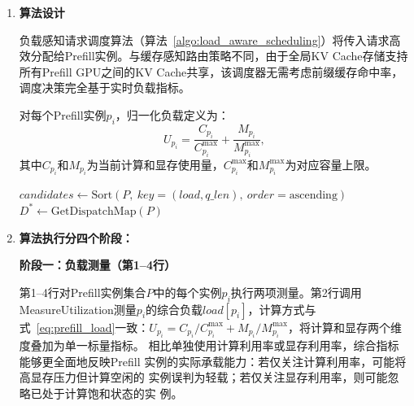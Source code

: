\begin{enumerate}
 
\item \textbf{算法设计}

负载感知请求调度算法（算法~\ref{algo:load_aware_scheduling}）将传入请求高效分配给Prefill实例。与缓存感知路由策略不同，由于全局KV Cache存储支持所有Prefill GPU之间的KV Cache共享，该调度器无需考虑前缀缓存命中率，调度决策完全基于实时负载指标。

对每个Prefill实例$p_i$，归一化负载定义为：
\begin{equation}
    U_{p_i} = \frac{C_{p_i}}{C^{\max}_{p_i}} + \frac{M_{p_i}}{M^{\max}_{p_i}},
    \label{eq:prefill_load}
\end{equation}
其中$C_{p_i}$和$M_{p_i}$为当前计算和显存使用量，$C^{\max}_{p_i}$和$M^{\max}_{p_i}$为对应容量上限。

\begin{algorithm}[htbp]
    \caption{负载感知请求调度算法}
    \label{algo:load_aware_scheduling}
    \BlankLine
    \BlankLine
    $candidates \leftarrow \text{Sort}(P,\ key=(load, q\_len),\ order=\text{ascending})$\;
    \BlankLine
    \BlankLine
    $D^* \leftarrow \text{GetDispatchMap}(P)$\;
    \;
\end{algorithm}

\item \textbf{算法执行分四个阶段：}

\textbf{阶段一：负载测量（第1--4行）}

第1--4行对Prefill实例集合$P$中的每个实例$p_i$执行两项测量。第2行调用
MeasureUtilization测量$p_i$的综合负载$load[p_i]$，计算方式与
式~\eqref{eq:prefill_load}一致：$U_{p_i} = C_{p_i}/C^{\max}_{p_i} +
M_{p_i}/M^{\max}_{p_i}$，将计算和显存两个维度叠加为单一标量指标。
相比单独使用计算利用率或显存利用率，综合指标能够更全面地反映Prefill
实例的实际承载能力：若仅关注计算利用率，可能将高显存压力但计算空闲的
实例误判为轻载；若仅关注显存利用率，则可能忽略已处于计算饱和状态的实
例。


\end{enumerate}
